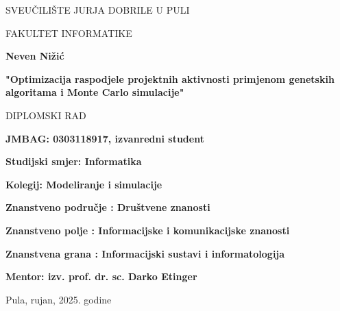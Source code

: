 \begin{center}
SVEUČILIŠTE JURJA DOBRILE U PULI 

FAKULTET INFORMATIKE

\vspace{45mm} 

\textbf{Neven Nižić}

\vspace{20mm} 

\textbf{"Optimizacija raspodjele projektnih aktivnosti primjenom genetskih algoritama i Monte Carlo simulacije"}

\vspace{5mm}
DIPLOMSKI RAD

\end{center}

\vspace{45mm}

\textbf{JMBAG: 0303118917, izvanredni student}

\textbf{Studijski smjer: Informatika}
\bigskip

\textbf{Kolegij: Modeliranje i simulacije}

\textbf{Znanstveno područje : Društvene znanosti}

\textbf{Znanstveno polje : Informacijske i komunikacijske znanosti}

\textbf{Znanstvena grana : Informacijski sustavi i informatologija}

\textbf{Mentor: izv. prof. dr. sc. Darko Etinger}

\bigskip
\vfill

\begin{center}

Pula, rujan, 2025. godine

\end{center}
